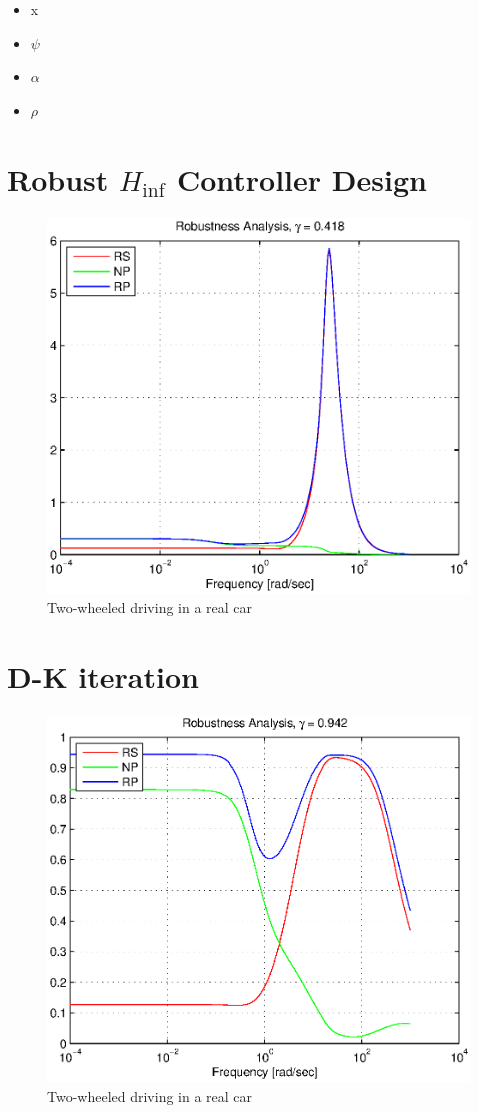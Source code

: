 \documentclass[conference]{IEEEtran}
\begin{document}
\begin{itemize}
    \item x
    \item $\psi$
    \item $\alpha$
    \item $\rho$
\end{itemize}


\section{Robust $H_{\inf}$ Controller Design}


\begin{figure}[h]
\centering
  \includegraphics[width=.47\textwidth]{pics/RP_before_DK} 
  \caption{Two-wheeled driving in a real car}  
  \label{figure:arab_driving}
\end{figure}


\section{D-K iteration}



\begin{figure}[h]
\centering
  \includegraphics[width=.47\textwidth]{pics/RP_after_DK} 
  \caption{Two-wheeled driving in a real car}  
  \label{figure:arab_driving}
\end{figure}
\end{document}
